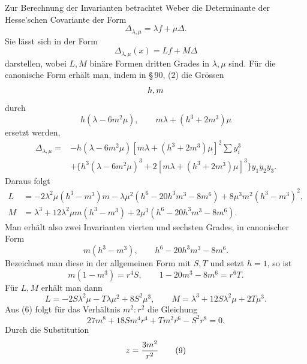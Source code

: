\documentclass[11pt]{article}
\begin{document}
Zur Berechnung der Invarianten betrachtet Weber die Determinante der Hesse'schen Covariante der Form
\begin{equation}
 \Delta_{\lambda,\mu}=\lambda f+\mu\Delta.
 \tag{1}
\end{equation}
Sie lässt sich in der Form
\begin{equation}
 \Delta_{\lambda,\mu}(x)=Lf+M\Delta
 \tag{2}
\end{equation}
darstellen, wobei $L,M$ binäre Formen dritten Grades in $\lambda,\mu$ sind. Für die canonische Form erhält man, indem in \S\,90, (2) die Grössen
\[
 h,\\ m
\]
durch
\[
 h(\lambda-6m^2\mu),\qquad m\lambda+(h^3+2m^3)\mu
\]
ersetzt werden,
\begin{equation}
\begin{aligned}
\Delta_{\lambda,\mu}={}&-h(\lambda-6m^2\mu)[m\lambda+(h^3+2m^3)\mu]^2\sum y_i^3\\
&+\{h^3(\lambda-6m^2\mu)^3+2[m\lambda+(h^3+2m^3)\mu]^3\}y_1y_2y_3.
\end{aligned}
\tag{3}
\end{equation}
Daraus folgt
\begin{equation}
\begin{aligned}
 L&=-2\lambda^2\mu(h^3-m^3)m-\lambda\mu^2(h^6-20h^3m^3-8m^6)+8\mu^3m^2(h^3-m^3)^2,\\
 M&=\lambda^3+12\lambda^2\mu m(h^3-m^3)+2\mu^3(h^6-20h^3m^3-8m^6).
\end{aligned}
\tag{4}
\end{equation}
Man erhält also zwei Invarianten vierten und sechsten Grades, in canonischer Form
\begin{equation}
 m(h^3-m^3),
 \qquad h^6-20h^3m^3-8m^6.
 \tag{5}
\end{equation}
Bezeichnet man diese in der allgemeinen Form mit $S,T$ und setzt $h=1$, so ist
\begin{equation}
 m(1-m^3)=r^4S,
 \qquad 1-20m^3-8m^6=r^6T.
 \tag{6}
\end{equation}
Für $L,M$ erhält man dann
\begin{equation}
 L=-2S\lambda^2\mu-T\lambda\mu^2+8S^2\mu^3,
 \qquad M=\lambda^3+12S\lambda^2\mu+2T\mu^3.
 \tag{7}
\end{equation}
Aus (6) folgt für das Verhältnis $m^2:r^2$ die Gleichung
\begin{equation}
 27m^8+18Sm^4r^4+Tm^2r^6-S^2r^8=0.
 \tag{8}
\end{equation}
Durch die Substitution
\begin{equation}
 z={3m^2\over r^2}
 \tag{9}
\end{equation}
\end{document}
